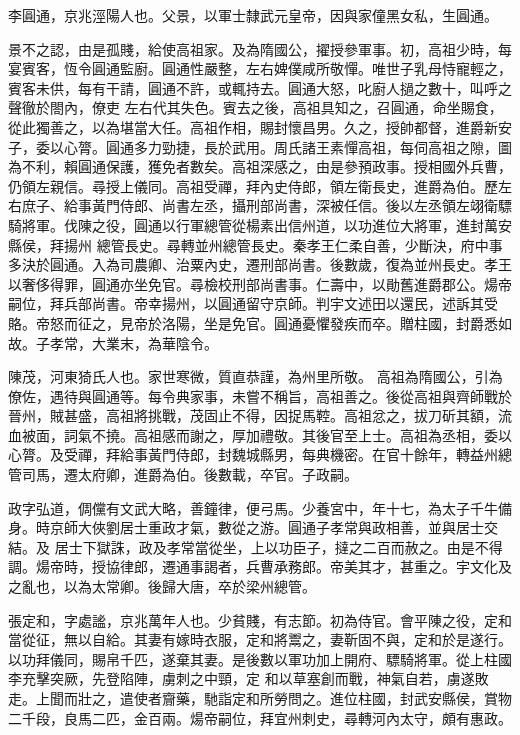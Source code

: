 
\begin{pinyinscope}

 李圓通，京兆涇陽人也。父景，以軍士隸武元皇帝，因與家僮黑女私，生圓通。



 景不之認，由是孤賤，給使高祖家。及為隋國公，擢授參軍事。初，高祖少時，每宴賓客，恆令圓通監廚。圓通性嚴整，左右婢僕咸所敬憚。唯世子乳母恃寵輕之，賓客未供，每有干請，圓通不許，或輒持去。圓通大怒，叱廚人撾之數十，叫呼之聲徹於閤內，僚吏
 左右代其失色。賓去之後，高祖具知之，召圓通，命坐賜食，從此獨善之，以為堪當大任。高祖作相，賜封懷昌男。久之，授帥都督，進爵新安子，委以心膂。圓通多力勁捷，長於武用。周氏諸王素憚高祖，每伺高祖之隙，圖為不利，賴圓通保護，獲免者數矣。高祖深感之，由是參預政事。授相國外兵曹，仍領左親信。尋授上儀同。高祖受禪，拜內史侍郎，領左衛長史，進爵為伯。歷左右庶子、給事黃門侍郎、尚書左丞，攝刑部尚書，深被任信。後以左丞領左翊衛驃騎將軍。伐陳之役，圓通以行軍總管從楊素出信州道，以功進位大將軍，進封萬安縣侯，拜揚州
 總管長史。尋轉並州總管長史。秦孝王仁柔自善，少斷決，府中事多決於圓通。入為司農卿、治粟內史，遷刑部尚書。後數歲，復為並州長史。孝王以奢侈得罪，圓通亦坐免官。尋檢校刑部尚書事。仁壽中，以勛舊進爵郡公。煬帝嗣位，拜兵部尚書。帝幸揚州，以圓通留守京師。判宇文述田以還民，述訴其受賂。帝怒而征之，見帝於洛陽，坐是免官。圓通憂懼發疾而卒。贈柱國，封爵悉如故。子孝常，大業末，為華陰令。



 陳茂，河東猗氏人也。家世寒微，質直恭謹，為州里所敬。
 高祖為隋國公，引為僚佐，遇待與圓通等。每令典家事，未嘗不稱旨，高祖善之。後從高祖與齊師戰於晉州，賊甚盛，高祖將挑戰，茂固止不得，因捉馬鞚。高祖忿之，拔刀斫其額，流血被面，詞氣不撓。高祖感而謝之，厚加禮敬。其後官至上士。高祖為丞相，委以心膂。及受禪，拜給事黃門侍郎，封魏城縣男，每典機密。在官十餘年，轉益州總管司馬，遷太府卿，進爵為伯。後數載，卒官。子政嗣。



 政字弘道，倜儻有文武大略，善鐘律，便弓馬。少養宮中，年十七，為太子千牛備身。時京師大俠劉居士重政才氣，數從之游。圓通子孝常與政相善，並與居士交結。及
 居士下獄誅，政及孝常當從坐，上以功臣子，撻之二百而赦之。由是不得調。煬帝時，授協律郎，遷通事謁者，兵曹承務郎。帝美其才，甚重之。宇文化及之亂也，以為太常卿。後歸大唐，卒於梁州總管。



 張定和，字處謐，京兆萬年人也。少貧賤，有志節。初為侍官。會平陳之役，定和當從征，無以自給。其妻有嫁時衣服，定和將鬻之，妻靳固不與，定和於是遂行。以功拜儀同，賜帛千匹，遂棄其妻。是後數以軍功加上開府、驃騎將軍。從上柱國李充擊突厥，先登陷陣，虜刺之中頸，定
 和以草塞創而戰，神氣自若，虜遂敗走。上聞而壯之，遣使者齎藥，馳詣定和所勞問之。進位柱國，封武安縣侯，賞物二千段，良馬二匹，金百兩。煬帝嗣位，拜宜州刺史，尋轉河內太守，頗有惠政。




\end{pinyinscope}
